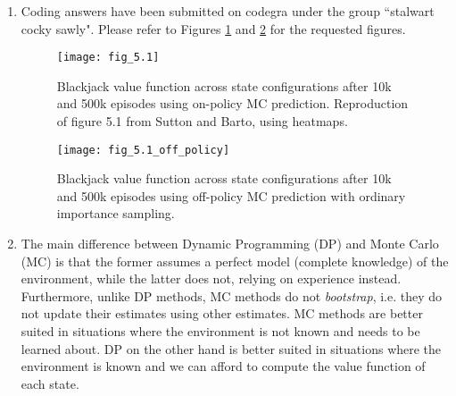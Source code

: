 \documentclass{article}
\begin{document}
\begin{enumerate}
	\item Coding answers have been submitted on codegra under the group ``stalwart cocky sawly".
	      Please refer to Figures \ref{fig:figure_5.1} and \ref{fig:v_function} for the requested figures.
	      \begin{figure}[ht]
		      \centering
		      \texttt{[image: fig\_5.1]}
		      \caption{Blackjack value function across state configurations after 10k and 500k episodes
			      using on-policy MC prediction. Reproduction of figure 5.1 from Sutton and Barto, using
			      heatmaps.}
		      \label{fig:figure_5.1}
	      \end{figure}

	      \begin{figure}[ht]
		      \centering
		      \texttt{[image: fig\_5.1\_off\_policy]}
		      \caption{Blackjack value function across state configurations after 10k and 500k episodes
			      using off-policy MC prediction with ordinary importance sampling.}
		      \label{fig:v_function}
	      \end{figure}
	\item The main difference between Dynamic Programming (DP) and Monte Carlo (MC) is that the former assumes
	      a perfect model (complete knowledge) of the environment, while the latter does not, relying
	      on experience instead. Furthermore, unlike DP methods, MC methods do not \textit{bootstrap},
	      i.e. they do not update their estimates using other estimates. MC methods are better suited
	      in situations where the environment is not known and needs to be learned about. DP on the
	      other hand is better suited in situations where the environment is known and we can afford
	      to compute the value function of each state.

\end{enumerate}
\end{document}
